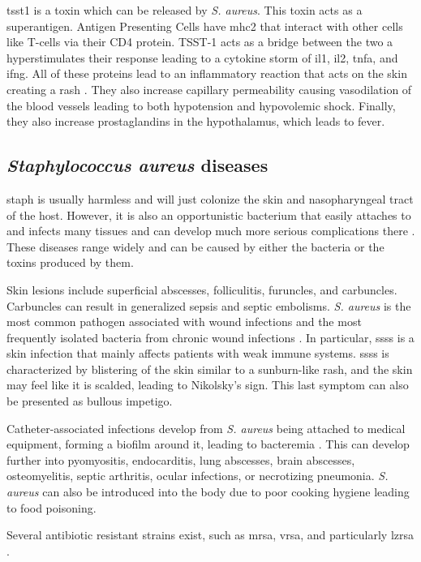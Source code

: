 \gls{tsst1} is a toxin which can be released by \textit{S. aureus}. This toxin acts as a superantigen. Antigen Presenting Cells have \gls{mhc2} that interact with other cells like T-cells via their CD4 protein. TSST-1 acts as a bridge between the two a hyperstimulates their response leading to a cytokine storm of \gls{il1}, \gls{il2}, \gls{tnfa}, and \gls{ifng}. All of these proteins lead to an inflammatory reaction that acts on the skin creating a rash \cite{Schlievert2021}. They also increase capillary permeability causing vasodilation of the blood vessels leading to both hypotension and hypovolemic shock. Finally, they also increase prostaglandins in the hypothalamus, which leads to fever.

\subsection{\textit{Staphylococcus aureus} diseases}

\gls{staph} is usually harmless and will just colonize the skin and nasopharyngeal tract of the host. However, it is also an opportunistic bacterium that easily attaches to and infects many tissues and can develop much more serious complications there \cite{Berry2022}. These diseases range widely and can be caused by either the bacteria or the toxins produced by them.

Skin lesions include superficial abscesses, folliculitis, furuncles, and carbuncles. Carbuncles can result in generalized sepsis and septic embolisms. \textit{S. aureus} is the most common pathogen associated with wound infections and the most frequently isolated bacteria from chronic wound infections \cite{Bhattacharya2015}. In particular, \gls{ssss} is a skin infection that mainly affects patients with weak immune systems. \gls{ssss} is characterized by blistering of the skin similar to a sunburn-like rash, and the skin may feel like it is scalded, leading to Nikolsky's sign. This last symptom can also be presented as bullous impetigo.

Catheter-associated infections develop from \textit{S. aureus} being attached to medical equipment, forming a biofilm around it, leading to bacteremia \cite{LpezCorts2020}. This can develop further into pyomyositis, endocarditis, lung abscesses, brain abscesses, osteomyelitis, septic arthritis, ocular infections, or necrotizing pneumonia. \textit{S. aureus} can also be introduced into the body due to poor cooking hygiene leading to food poisoning.

Several antibiotic resistant strains exist, such as \gls{mrsa}, \gls{vrsa}, and particularly \gls{lzrsa} \cite{ref:NORMReport, Tsiodras2001, Jones2007, Mendes2008, IkedaDantsuji2011, Seral2011, Mendes2010}.

